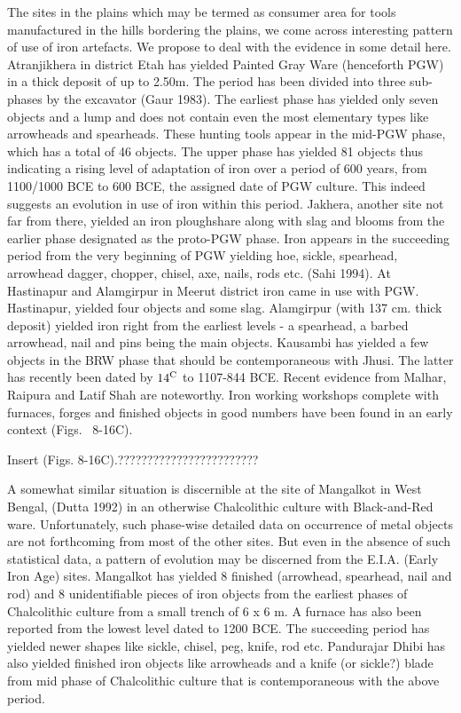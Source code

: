 The sites in the plains which may be termed as consumer area for tools manufactured in the hills bordering the plains, we come across interesting pattern of use of iron artefacts. We propose to deal with the evidence in some detail here. Atranjikhera in district Etah has yielded Painted Gray Ware (henceforth PGW) in a thick deposit of up to 2.50m. The period has been divided into three sub-phases by the excavator (Gaur 1983). The earliest phase has yielded only seven objects and a lump and does not contain even the most elementary types like arrowheads and spearheads. These hunting tools appear in the mid-PGW phase, which has a total of 46 objects. The upper phase has yielded 81 objects thus indicating a rising level of adaptation of iron over a period of 600 years, from 1100/1000 BCE to 600 BCE, the assigned date of PGW culture. This indeed suggests an evolution in use of iron within this period. Jakhera, another site not far from there, yielded an iron ploughshare along with slag and blooms from the earlier phase designated as the proto-PGW phase. Iron appears in the succeeding period from the very beginning of PGW yielding hoe, sickle, spearhead, arrowhead dagger, chopper, chisel, axe, nails, rods etc. (Sahi 1994). At Hastinapur and Alamgirpur in Meerut district iron came in use with PGW. Hastinapur, yielded four objects and some slag. Alamgirpur (with 137 cm. thick deposit) yielded iron right from the earliest levels - a spearhead, a barbed arrowhead, nail and pins being the main objects. Kausambi has yielded a few objects in the BRW phase that should be contemporaneous with Jhusi. The latter has recently been dated by $14^{\rm C}$ to 1107-844 BCE. Recent evidence from Malhar, Raipura and Latif Shah are noteworthy. Iron working workshops complete with furnaces, forges and finished objects in good numbers have been found in an early context (Figs.~ 8-16C).

Insert (Figs. 8-16C).????????????????????????

 A somewhat similar situation is discernible at the site of Mangalkot in West Bengal, (Dutta 1992) in an otherwise Chalcolithic culture with Black-and-Red ware. Unfortunately, such phase-wise detailed data on occurrence of metal objects are not forthcoming from most of the other sites. But even in the absence of such statistical data, a pattern of evolution may be discerned from the E.I.A. (Early Iron Age) sites. Mangalkot has yielded 8 finished (arrowhead, spearhead, nail and rod) and 8 unidentifiable pieces of iron objects from the earliest phases of Chalcolithic culture from a small trench of 6 x 6 m. A furnace has also been reported from the lowest level dated to 1200 BCE. The succeeding period has yielded newer shapes like sickle, chisel, peg, knife, rod etc. Pandurajar Dhibi has also yielded finished iron objects like arrowheads and a knife (or sickle?) blade from mid phase of Chalcolithic culture that is contemporaneous with the above period.

